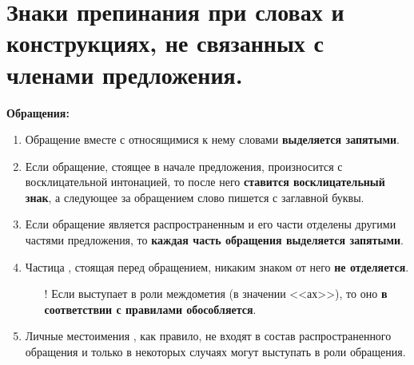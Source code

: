 \documentclass[main]{subfile}
\begin{document}
\section{Знаки препинания при словах и конструкциях, не связанных с членами предложения.}
\textbf{Обращения:}

\begin{enumerate}
      \item Обращение вместе с относящимися к нему словами \textbf{выделяется запятыми}. \newline
      \item Если обращение, стоящее в начале предложения, произносится с восклицательной интонацией, то после него \textbf{ставится восклицательный знак}, а следующее за обращением слово пишется с заглавной буквы. \newline
      \item Если обращение является распространенным и его части отделены другими частями предложения, то \textbf{каждая часть обращения выделяется запятыми}. \newline
      \item Частица , стоящая перед обращением, никаким знаком от него \textbf{не отделяется}. \newline
            \begin{itemize}
                  \item[!] Если  выступает в роли междометия (в значении <<ах>>), то оно \textbf{в соответствии с правилами обособляется}. \newline
            \end{itemize}
      \item Личные местоимения , как правило, не входят в состав распространенного обращения и только в некоторых случаях могут выступать в роли обращения. \newline
\end{enumerate}
\end{document}
